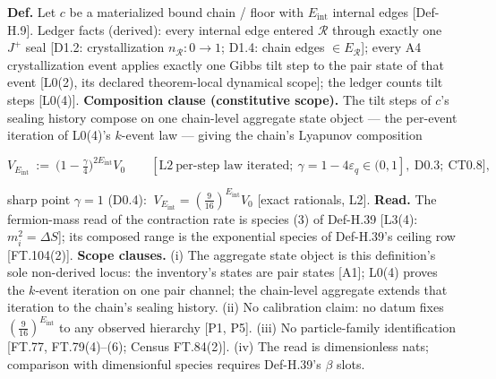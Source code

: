 \begin{definition}\label{tag:Def-H-40}
\textbf{Def.} Let $c$ be a materialized bound chain / floor with $E_{\mathrm{int}}$ internal edges [Def-H.9]. Ledger facts (derived): every internal edge entered $\mathcal R$ through exactly one $J^+$ seal [D1.2: crystallization $n_{\mathcal R}:0\to1$; D1.4: chain edges $\in E_{\mathcal R}$]; every A4 crystallization event applies exactly one Gibbs tilt step to the pair state of that event [L0(2), its declared theorem-local dynamical scope]; the ledger counts tilt steps [L0(4)]. \textbf{Composition clause (constitutive scope).} The tilt steps of $c$'s sealing history compose on one chain-level aggregate state object — the per-event iteration of L0(4)'s $k$-event law — giving the chain's Lyapunov composition

\[
V_{E_{\mathrm{int}}}\ :=\ \bigl(1-\tfrac\gamma4\bigr)^{2E_{\mathrm{int}}}V_0\qquad[\mathrm{L2}\ \text{per-step law iterated};\ \gamma=1-4\varepsilon_q\in(0,1],\ \mathrm{D0.3};\ \mathrm{CT0.8}],
\]

sharp point $\gamma=1$ (D0.4): $\ V_{E_{\mathrm{int}}}=(\tfrac9{16})^{E_{\mathrm{int}}}V_0$ [exact rationals, L2]. \textbf{Read.} The fermion-mass read of the contraction rate is species (3) of Def-H.39 [L3(4): $m_i^2=\Delta S$]; its composed range is the exponential species of Def-H.39's ceiling row [FT.104(2)]. \textbf{Scope clauses.} (i) The aggregate state object is this definition's sole non-derived locus: the inventory's states are pair states [A1]; L0(4) proves the $k$-event iteration on one pair channel; the chain-level aggregate extends that iteration to the chain's sealing history. (ii) No calibration claim: no datum fixes $(\tfrac9{16})^{E_{\mathrm{int}}}$ to any observed hierarchy [P1, P5]. (iii) No particle-family identification [FT.77, FT.79(4)–(6); Census FT.84(2)]. (iv) The read is dimensionless nats; comparison with dimensionful species requires Def-H.39's $\beta$ slots.

\end{definition}

